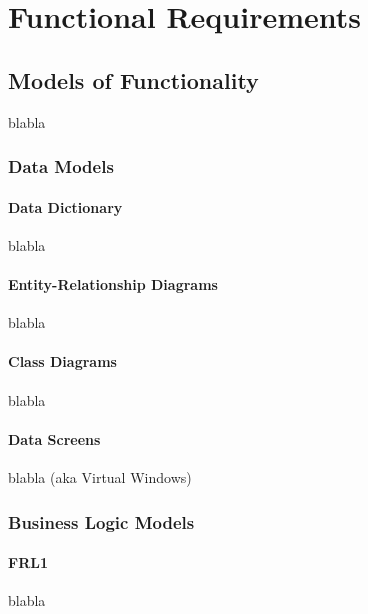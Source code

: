 
\part{Functional Requirements}

\chapter{Models of Functionality}%
blabla

\section{Data Models}%

\subsection{Data Dictionary}
blabla

\subsection{Entity-Relationship Diagrams}
blabla

\subsection{Class Diagrams}
blabla

\subsection{Data Screens}
blabla  (aka Virtual Windows)

\section{Business Logic Models}%
\subsection{FRL1}
blabla


